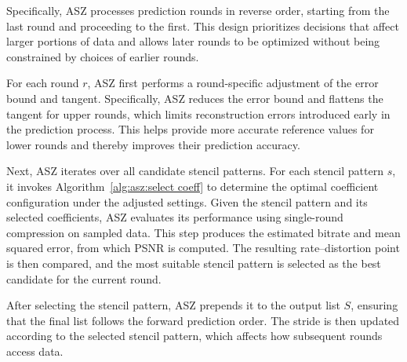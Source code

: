 Specifically, ASZ processes prediction rounds in reverse order, starting from the last round and proceeding to the first.
This design prioritizes decisions that affect larger portions of data and allows later rounds to be optimized without being constrained by choices of earlier rounds.

For each round $r$, ASZ first performs a round-specific adjustment of the error bound and tangent. Specifically, ASZ reduces the error bound and flattens the tangent for upper rounds, which limits reconstruction errors introduced early in the prediction process. This helps provide more accurate reference values for lower rounds and thereby improves their prediction accuracy.

Next, ASZ iterates over all candidate stencil patterns.
For each stencil pattern $s$, it invokes Algorithm~\ref{alg:asz:select coeff} to determine the optimal coefficient configuration under the adjusted settings.
Given the stencil pattern and its selected coefficients, ASZ evaluates its performance using single-round compression on sampled data.
This step produces the estimated bitrate and mean squared error, from which PSNR is computed.
The resulting rate–distortion point is then compared, and the most suitable stencil pattern is selected as the best candidate for the current round.

After selecting the stencil pattern, ASZ prepends it to the output list $S$, ensuring that the final list follows the forward prediction order.
The stride is then updated according to the selected stencil pattern, which affects how subsequent rounds access data.




